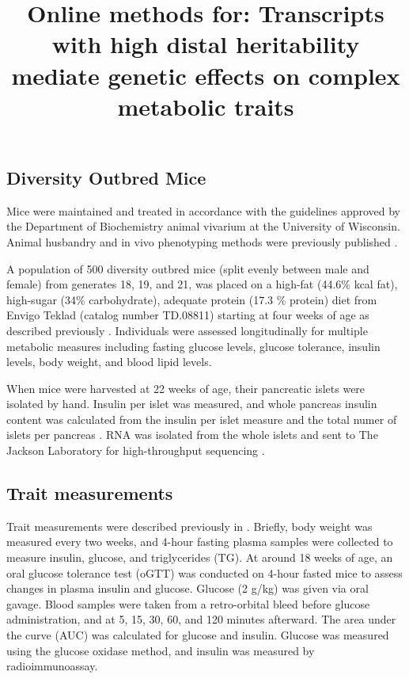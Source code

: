 \documentclass[
]{article}
\title{Online methods for: Transcripts with high distal heritability
mediate genetic effects on complex metabolic traits}
\author{}
\date{\vspace{-2.5em}}
\begin{document}
\maketitle

\subsection{Diversity Outbred Mice}\label{diversity-outbred-mice}

Mice were maintained and treated in accordance with the guidelines
approved by the Department of Biochemistry animal vivarium at the
University of Wisconsin. Animal husbandry and in vivo phenotyping
methods were previously published \cite{pmid31343992, pmid29567659}.

A population of 500 diversity outbred mice (split evenly between male
and female) from generates 18, 19, and 21, was placed on a high-fat
(44.6\% kcal fat), high-sugar (34\% carbohydrate), adequate protein
(17.3 \% protein) diet from Envigo Teklad (catalog number TD.08811)
starting at four weeks of age as described previously
\cite{pmid29567659}. Individuals were assessed longitudinally for
multiple metabolic measures including fasting glucose levels, glucose
tolerance, insulin levels, body weight, and blood lipid levels.

When mice were harvested at 22 weeks of age, their pancreatic islets
were isolated by hand. Insulin per islet was measured, and whole
pancreas insulin content was calculated from the insulin per islet
measure and the total numer of islets per pancreas \cite{pmid29567659}.
RNA was isolated from the whole islets and sent to The Jackson
Laboratory for high-throughput sequencing \cite{pmid29567659}.

\subsection{Trait measurements}\label{trait-measurements}

Trait measurements were described previously in \cite{pmid29567659}.
Briefly, body weight was measured every two weeks, and 4-hour fasting
plasma samples were collected to measure insulin, glucose, and
triglycerides (TG). At around 18 weeks of age, an oral glucose tolerance
test (oGTT) was conducted on 4-hour fasted mice to assess changes in
plasma insulin and glucose. Glucose (2 g/kg) was given via oral gavage.
Blood samples were taken from a retro-orbital bleed before glucose
administration, and at 5, 15, 30, 60, and 120 minutes afterward. The
area under the curve (AUC) was calculated for glucose and insulin.
Glucose was measured using the glucose oxidase method, and insulin was
measured by radioimmunoassay.
\end{document}
